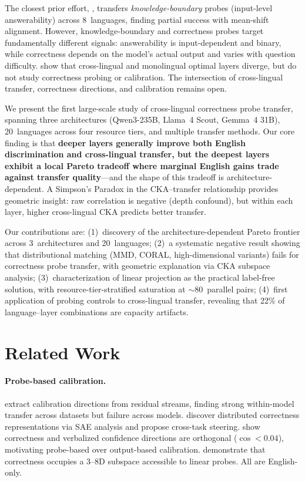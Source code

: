 \documentclass[11pt,a4paper]{article}
\newcommand{\cka}{\textsc{CKA}}
\begin{document}
The closest prior effort, \citet{xiao2025knowledge}, transfers \emph{knowledge-boundary} probes (input-level answerability) across 8~languages, finding partial success with mean-shift alignment. However, knowledge-boundary and correctness probes target fundamentally different signals: answerability is input-dependent and binary, while correctness depends on the model's actual output and varies with question difficulty. \citet{civelli2026shared} show that cross-lingual and monolingual optimal layers diverge, but do not study correctness probing or calibration. The intersection of cross-lingual transfer, correctness directions, and calibration remains open.

We present the first large-scale study of cross-lingual correctness probe transfer, spanning three architectures (Qwen3-235B, Llama~4 Scout, Gemma~4 31B), 20~languages across four resource tiers, and multiple transfer methods. Our core finding is that \textbf{deeper layers generally improve both English discrimination and cross-lingual transfer, but the deepest layers exhibit a local Pareto tradeoff where marginal English gains trade against transfer quality}---and the shape of this tradeoff is architecture-dependent. A Simpson's Paradox in the \cka{}--transfer relationship provides geometric insight: raw correlation is negative (depth confound), but within each layer, higher cross-lingual \cka{} predicts better transfer.

Our contributions are: (1)~discovery of the architecture-dependent Pareto frontier across 3~architectures and 20~languages; (2)~a systematic negative result showing that distributional matching (MMD, CORAL, high-dimensional variants) fails for correctness probe transfer, with geometric explanation via \cka{} subspace analysis; (3)~characterization of linear projection as the practical label-free solution, with resource-tier-stratified saturation at ${\sim}80$~parallel pairs; (4)~first application of probing controls \cite{hewitt2019designing} to cross-lingual transfer, revealing that 22\% of language--layer combinations are capacity artifacts.

\section{Related Work}

\paragraph{Probe-based calibration.}
\citet{joshi2025calibration} extract calibration directions from residual streams, finding strong within-model transfer across datasets but failure across models. \citet{miao2026coral} discover distributed correctness representations via SAE analysis and propose cross-task steering. \citet{miao2026closing} show correctness and verbalized confidence directions are orthogonal ($\cos < 0.04$), motivating probe-based over output-based calibration. \citet{confidence_manifold2026} demonstrate that correctness occupies a 3--8D subspace accessible to linear probes. All are English-only.
\end{document}
